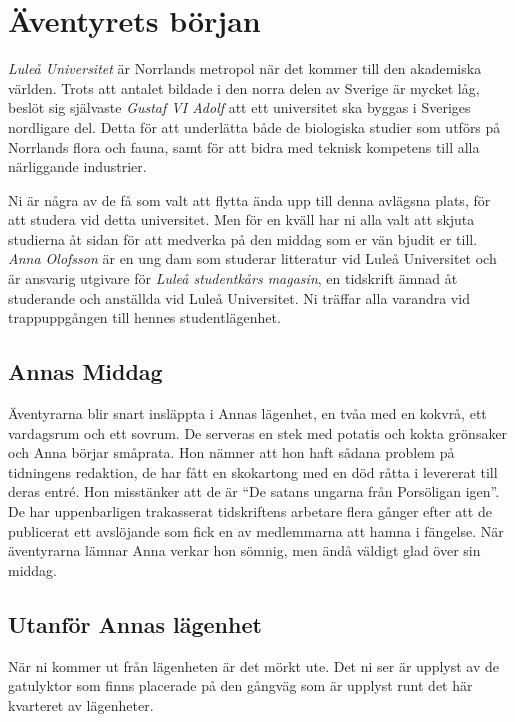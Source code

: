 \section{Äventyrets början}

\begin{displayquote}
	\textit{Luleå Universitet} är Norrlands metropol när det kommer till den akademiska världen. Trots att antalet bildade i den norra delen av Sverige är mycket låg, beslöt sig självaste \textit{Gustaf VI Adolf} att ett universitet ska byggas i Sveriges nordligare del. Detta för att underlätta både de biologiska studier som utförs på Norrlands flora och fauna, samt för att bidra med teknisk kompetens till alla närliggande industrier.

	Ni är några av de få som valt att flytta ända upp till denna avlägsna plats, för att studera vid detta universitet. Men för en kväll har ni alla valt att skjuta studierna åt sidan för att medverka på den middag som er vän bjudit er till. \textit{Anna Olofsson} är en ung dam som studerar litteratur vid Luleå Universitet och är ansvarig utgivare för \textit{Luleå studentkårs magasin}, en tidskrift ämnad åt studerande och anställda vid Luleå Universitet. Ni träffar alla varandra vid trappuppgången till hennes studentlägenhet.
\end{displayquote}

\subsection{Annas Middag}

Äventyrarna blir snart insläppta i Annas lägenhet, en tvåa med en kokvrå, ett vardagsrum och ett sovrum. De serveras en stek med potatis och kokta grönsaker och Anna börjar småprata. Hon nämner att hon haft sådana problem på tidningens redaktion, de har fått en skokartong med en död råtta i levererat till deras entré. Hon misstänker att de är ``De satans ungarna från Porsöligan igen''. De har uppenbarligen trakasserat tidskriftens arbetare flera gånger efter att de publicerat ett avslöjande som fick en av medlemmarna att hamna i fängelse. När äventyrarna lämnar Anna verkar hon sömnig, men ändå väldigt glad över sin middag. 

\subsection{Utanför Annas lägenhet}
När ni kommer ut från lägenheten är det mörkt ute. Det ni ser är upplyst av de gatulyktor som finns placerade på den gångväg som är upplyst runt det här kvarteret av lägenheter.

